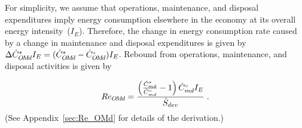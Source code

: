 \documentclass[12pt]{article}\usepackage[]{graphicx}\usepackage[]{xcolor}
\begin{document}
For simplicity, we assume that operations, maintenance, and disposal
expenditures imply energy consumption
elsewhere in the economy at its overall energy intensity~($I_E$).
Therefore, the change in energy consumption rate caused by a change 
in maintenance and disposal expenditures
is given by $\Delta {\dot{C}}^*_{O\!M\!d} I_E = 
                         ({\dot{C}}^*_{O\!M\!d} - {}{\dot{C}}^{\scriptscriptstyle \circ}_{O\!M\!d}) I_E$.
Rebound from operations, maintenance, and disposal activities 
is given by 

\begin{equation} \label{eq:Re_md}
  Re_{O\!M\!d} = \frac{\left( \frac{{\dot{C}}^*_{md}}{{}{\dot{C}}^{\scriptscriptstyle \circ}_{md}} - 1 \right) {}{\dot{C}}^{\scriptscriptstyle \circ}_{md} I_E}{\dot{S}_{dev}}{} \; .
\end{equation}
%
(See Appendix~\ref{sec:Re_OMd} for details of the derivation.)


\subsubsection{\Subeffect}
\label{sec:sub_effect_main_paper}
\end{document}
